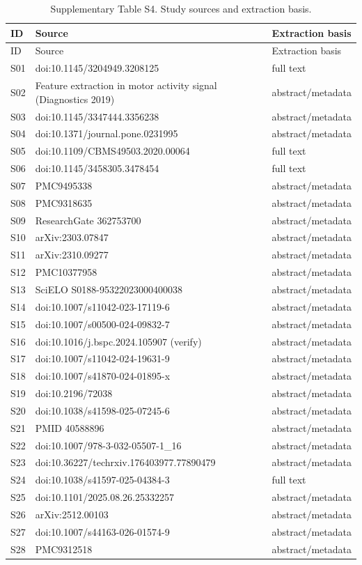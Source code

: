 \begin{longtable}{lp{9cm}l}\caption{Supplementary Table S4. Study sources and extraction basis.}\\\toprule ID & Source & Extraction basis\\\midrule\endfirsthead\toprule ID & Source & Extraction basis\\\midrule\endhead
S01 & doi:10.1145/3204949.3208125 & full text\\
S02 & Feature extraction in motor activity signal (Diagnostics 2019) & abstract/metadata\\
S03 & doi:10.1145/3347444.3356238 & abstract/metadata\\
S04 & doi:10.1371/journal.pone.0231995 & abstract/metadata\\
S05 & doi:10.1109/CBMS49503.2020.00064 & full text\\
S06 & doi:10.1145/3458305.3478454 & full text\\
S07 & PMC9495338 & abstract/metadata\\
S08 & PMC9318635 & abstract/metadata\\
S09 & ResearchGate 362753700 & abstract/metadata\\
S10 & arXiv:2303.07847 & abstract/metadata\\
S11 & arXiv:2310.09277 & abstract/metadata\\
S12 & PMC10377958 & abstract/metadata\\
S13 & SciELO S0188-95322023000400038 & abstract/metadata\\
S14 & doi:10.1007/s11042-023-17119-6 & abstract/metadata\\
S15 & doi:10.1007/s00500-024-09832-7 & abstract/metadata\\
S16 & doi:10.1016/j.bspc.2024.105907 (verify) & abstract/metadata\\
S17 & doi:10.1007/s11042-024-19631-9 & abstract/metadata\\
S18 & doi:10.1007/s41870-024-01895-x & abstract/metadata\\
S19 & doi:10.2196/72038 & abstract/metadata\\
S20 & doi:10.1038/s41598-025-07245-6 & abstract/metadata\\
S21 & PMID 40588896 & abstract/metadata\\
S22 & doi:10.1007/978-3-032-05507-1\_16 & abstract/metadata\\
S23 & doi:10.36227/techrxiv.176403977.77890479 & abstract/metadata\\
S24 & doi:10.1038/s41597-025-04384-3 & full text\\
S25 & doi:10.1101/2025.08.26.25332257 & abstract/metadata\\
S26 & arXiv:2512.00103 & abstract/metadata\\
S27 & doi:10.1007/s44163-026-01574-9 & abstract/metadata\\
S28 & PMC9312518 & abstract/metadata\\
\bottomrule\end{longtable}
